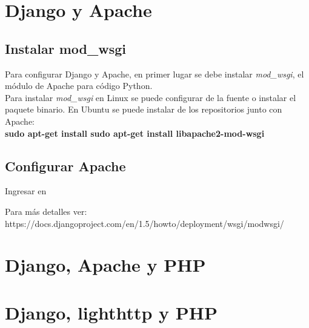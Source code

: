 \section{Django y Apache}

\subsection{Instalar mod\_wsgi}

Para configurar Django y Apache, en primer lugar se debe instalar \textit{mod\_wsgi}, el módulo de Apache para código Python.\\

Para instalar \textit{mod\_wsgi} en Linux se puede configurar de la fuente o instalar el paquete binario. En Ubuntu se puede instalar de los repositorios junto con Apache:\\

\textbf{sudo apt-get install  sudo apt-get install libapache2-mod-wsgi}\\

\subsection{Configurar Apache}

Ingresar en 

Para más detalles ver: https://docs.djangoproject.com/en/1.5/howto/deployment/wsgi/modwsgi/

\section{Django, Apache y PHP}

\section{Django, lighthttp y PHP}




